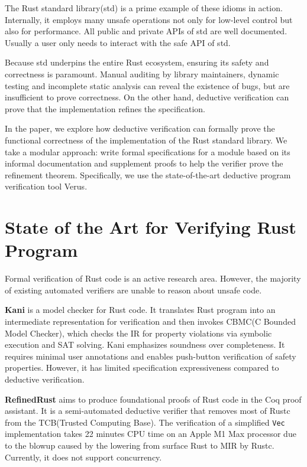 \documentclass[conference]{IEEEtran}
\begin{document}
The Rust standard library(std) is a prime example of these idioms in action. Internally, it employs many unsafe operations not only for low-level control but also for performance. All public and private APIs of std are well documented. Usually a user only needs to interact with the safe API of std.  


Because std underpins the entire Rust ecosystem, ensuring its safety and correctness is paramount. Manual auditing by library maintainers, dynamic testing and incomplete static analysis can reveal the existence of bugs, but are insufficient to prove correctness. On the other hand, deductive verification can prove that the implementation refines the specification.           


In the paper, we explore how deductive verification can formally prove the functional correctness of the implementation of the Rust standard library. We take a modular approach: write formal specifications for a module based on its informal documentation and supplement proofs to help the verifier prove the refinement theorem. Specifically, we use the state-of-the-art deductive program verification tool Verus\cite{verus}. 
        
\section{State of the Art for Verifying Rust Program}
Formal verification of Rust code is an active research area. However, the majority of existing automated verifiers are unable to reason about unsafe code. 

\textbf{Kani}\cite{kani} is a model checker for Rust code. It translates Rust program into an intermediate representation for verification and then invokes CBMC(C Bounded Model Checker)\cite{kroening2023cbmccboundedmodel}, which checks the IR for property violations via symbolic execution and SAT solving. Kani emphasizes soundness over completeness. It requires minimal user annotations and enables push-button verification of safety properties. However, it has limited specification expressiveness compared to deductive verification.   

\textbf{RefinedRust}\cite{RefinedRust} aims to produce foundational proofs of Rust code in the Coq proof assistant. It is a semi-automated deductive verifier that removes most of Rustc from the TCB(Trusted Computing Base). The verification of a simplified \texttt{Vec} implementation takes 22 minutes CPU time on an Apple M1 Max processor due to the blowup caused by the lowering from surface Rust to MIR by Rustc. Currently, it does not support concurrency.       
\end{document}
